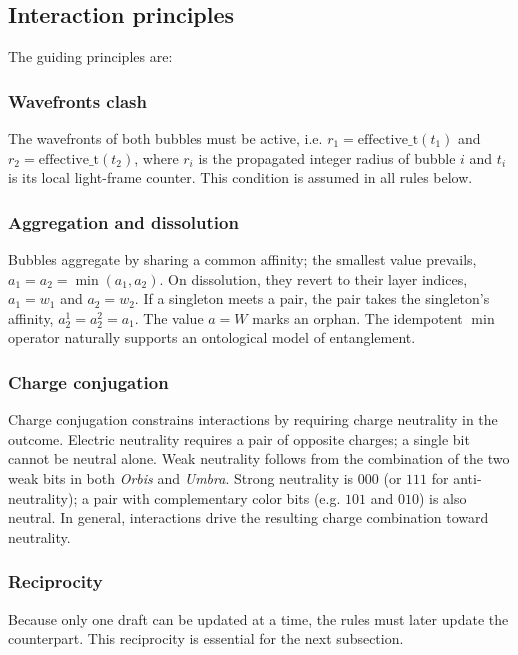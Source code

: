\documentclass{ijuc}
\begin{document}
\subsection{Interaction principles}
The guiding principles are:

\subsubsection{Wavefronts clash}
The wavefronts of both bubbles must be active, i.e. $r_1 = \mathrm{effective\_t}(t_1)$ and $r_2 = \mathrm{effective\_t}(t_2)$, where $r_i$ is the propagated integer radius of bubble $i$ and $t_i$ is its local light-frame counter. This condition is assumed in all rules below.

\subsubsection{Aggregation and dissolution}\label{subsec-role-of-affinity}

Bubbles aggregate by sharing a common affinity; the smallest value prevails, $a_1=a_2=\min(a_1,a_2)$. On dissolution, they revert to their layer indices, $a_1=w_1$ and $a_2=w_2$. If a singleton meets a pair, the pair takes the singleton's affinity, $a_2^1=a_2^2=a_1$. The value $a=W$ marks an orphan. The idempotent $\min$ operator naturally supports an ontological model of entanglement.

\subsubsection{Charge conjugation}

Charge conjugation constrains interactions by requiring charge neutrality in the outcome. Electric neutrality requires a pair of opposite charges; a single bit cannot be neutral alone. Weak neutrality follows from the combination of the two weak bits in both \textit{Orbis} and \textit{Umbra}. Strong neutrality is $000$ (or $111$ for anti-neutrality); a pair with complementary color bits (e.g. $101$ and $010$) is also neutral. In general, interactions drive the resulting charge combination toward neutrality.

\subsubsection{Reciprocity}
Because only one draft can be updated at a time, the rules must later update the counterpart. This reciprocity is essential for the next subsection.
\end{document}
